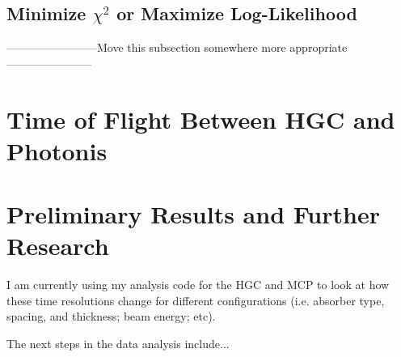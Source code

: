 \documentclass[12pt]{article}
\begin{document}
\subsection{Minimize $\chi^2$ or Maximize Log-Likelihood}
------------------------Move this subsection somewhere more appropriate-----------------------

\section{Time of Flight Between HGC and Photonis}

\section{Preliminary Results and Further Research}
I am currently using my analysis code for the HGC and MCP to look at how these time resolutions change for different configurations (i.e. absorber type, spacing, and thickness; beam energy; etc). 

The next steps in the data analysis include...
\end{document}

